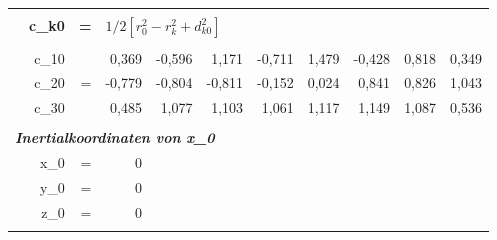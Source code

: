 \begin{table}[h]
\begin{tabular}{r|rrr|r|r|r|r|rrr}
    \multicolumn{1}{r}{} &       &       & \multicolumn{1}{r}{} & \multicolumn{1}{r}{} & \multicolumn{1}{r}{} & \multicolumn{1}{r}{} & \multicolumn{1}{r}{} &       &       &  \\
    \multicolumn{1}{r}{} & \textbf{c\_k0} & \textbf{=} & \multicolumn{8}{l}{$1/2[r_0^2-r_k^2+d_{k0}^2]$} \\
    \multicolumn{1}{r}{} &       &       & \multicolumn{1}{r}{\textbf{}} & \multicolumn{1}{r}{\textbf{}} & \multicolumn{1}{r}{\textbf{}} & \multicolumn{1}{r}{\textbf{}} & \multicolumn{1}{r}{\textbf{}} & \textbf{} & \textbf{} & \textbf{} \\
    \multicolumn{1}{r}{} & c\_10 &       & \multicolumn{1}{r}{0,369} & \multicolumn{1}{r}{-0,596} & \multicolumn{1}{r}{1,171} & \multicolumn{1}{r}{-0,711} & \multicolumn{1}{r}{1,479} & -0,428 & 0,818 & 0,349 \\
    \multicolumn{1}{r}{} & c\_20 & =     & \multicolumn{1}{r}{-0,779} & \multicolumn{1}{r}{-0,804} & \multicolumn{1}{r}{-0,811} & \multicolumn{1}{r}{-0,152} & \multicolumn{1}{r}{0,024} & 0,841 & 0,826 & 1,043 \\
    \multicolumn{1}{r}{} & c\_30 &       & \multicolumn{1}{r}{0,485} & \multicolumn{1}{r}{1,077} & \multicolumn{1}{r}{1,103} & \multicolumn{1}{r}{1,061} & \multicolumn{1}{r}{1,117} & 1,149 & 1,087 & 0,536 \\
    \multicolumn{1}{r}{} &       &       & \multicolumn{1}{r}{} & \multicolumn{1}{r}{} & \multicolumn{1}{r}{} & \multicolumn{1}{r}{} & \multicolumn{1}{r}{} &       &       &  \\
    \multicolumn{11}{l}{\textit{\textbf{Inertialkoordinaten von x\_0}}} \\
    \multicolumn{1}{r}{} & x\_0  & =     & \multicolumn{1}{r}{0} & \multicolumn{1}{r}{} & \multicolumn{1}{r}{} & \multicolumn{1}{r}{} & \multicolumn{1}{r}{} &       &       &  \\
    \multicolumn{1}{r}{} & y\_0  & =     & \multicolumn{1}{r}{0} & \multicolumn{1}{r}{} & \multicolumn{1}{r}{} & \multicolumn{1}{r}{} & \multicolumn{1}{r}{} &       &       &  \\
    \multicolumn{1}{r}{} & z\_0  & =     & \multicolumn{1}{r}{0} & \multicolumn{1}{r}{} & \multicolumn{1}{r}{} & \multicolumn{1}{r}{} & \multicolumn{1}{r}{} &       &       &  \\
    \multicolumn{1}{r}{} &       &       & \multicolumn{1}{r}{} & \multicolumn{1}{r}{} & \multicolumn{1}{r}{} & \multicolumn{1}{r}{} & \multicolumn{1}{r}{} &       &       &  \\

\end{tabular}
\end{table}
